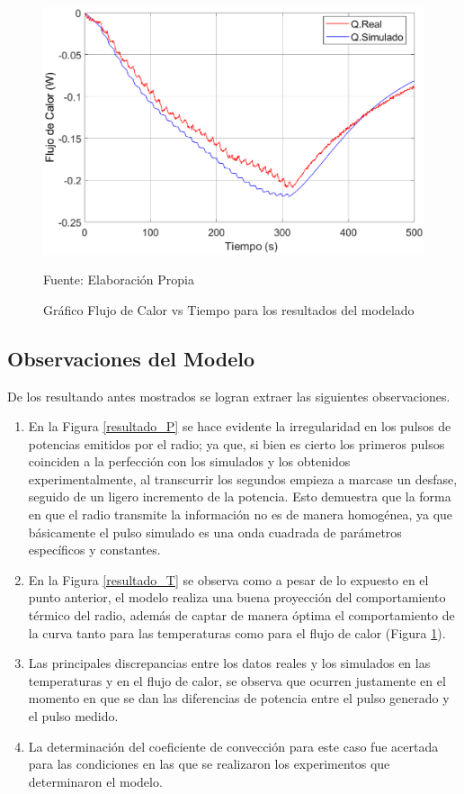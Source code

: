\begin{figure}[H]
\centering
\includegraphics[scale=0.75]{Figuras/Resultado_Q.eps}
\caption{Gráfico Flujo de Calor vs Tiempo para los resultados del modelado}
Fuente: Elaboración Propia
\label{resultado_Q}
\end{figure}

\subsection{Observaciones del Modelo}

De los resultando antes mostrados se logran extraer las siguientes observaciones.

\begin{enumerate}
    \item En la Figura \ref{resultado_P} se hace evidente la irregularidad en los pulsos de potencias emitidos por el radio; ya que, si bien es cierto los primeros pulsos coinciden a la perfección con los simulados y los obtenidos experimentalmente, al transcurrir los segundos empieza a marcase un desfase, seguido de un ligero incremento de la potencia. Esto demuestra que la forma en que el radio transmite la información no es de manera homogénea, ya que básicamente el pulso simulado es una onda cuadrada de parámetros específicos y constantes.
    \item En la Figura \ref{resultado_T} se observa como a pesar de lo expuesto en el punto anterior, el modelo realiza una buena proyección del comportamiento térmico del radio, además de captar de manera óptima el comportamiento de la curva tanto para las temperaturas como para el flujo de calor (Figura \ref{resultado_Q}).
    \item Las principales discrepancias entre los datos reales y los simulados en las temperaturas y en el flujo de calor, se observa que ocurren justamente en el momento en que se dan las diferencias de potencia entre el pulso generado y el pulso medido.
    \item La determinación del coeficiente de convección para este caso fue acertada para las condiciones en las que se realizaron los experimentos que determinaron el modelo.
\end{enumerate}

